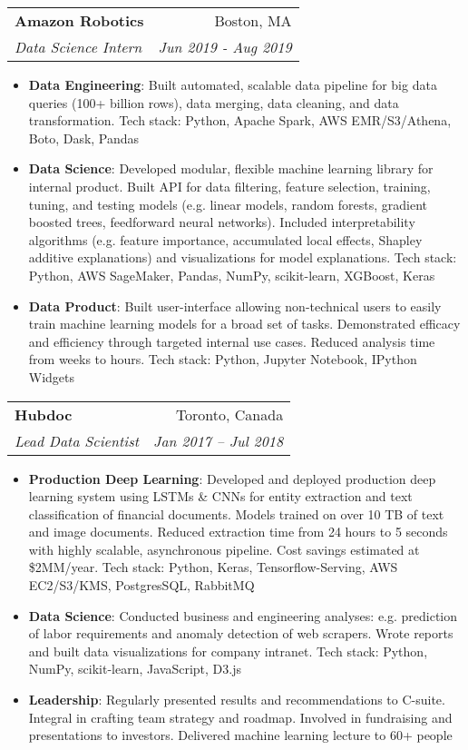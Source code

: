 \documentclass[letterpaper,11pt]{article}
\makeatletter
\newcommand{\resumeItem}[2]{
  \item\small{
    \textbf{#1}{: #2 \vspace{-2pt}}
  }
}
\newcommand{\resumeSubheading}[4]{
  \vspace{-1pt}\item
    \begin{tabular*}{0.97\textwidth}[t]{l@{\extracolsep{\fill}}r}
      \textbf{#1} & #2 \\
      \textit{\small#3} & \textit{\small #4} \\
    \end{tabular*}\vspace{-5pt}
}
\newcommand{\resumeItemListStart}{\begin{itemize}}
\newcommand{\resumeItemListEnd}{\end{itemize}\vspace{-5pt}}
\makeatother
\begin{document}
  \resumeSubheading
    {Amazon Robotics}{Boston, MA}
    {Data Science Intern}{Jun 2019 - Aug 2019}
    \resumeItemListStart
      \resumeItem{Data Engineering}
        {Built automated, scalable data pipeline for big data queries (100+ billion rows), data merging, data cleaning,
        and data transformation. Tech stack: Python, Apache Spark, AWS EMR/S3/Athena, Boto, Dask, Pandas}
      \resumeItem{Data Science}
        {Developed modular, flexible machine learning library for internal product. Built API for data filtering,
        feature selection, training, tuning, and testing models (e.g. linear models, random forests, gradient boosted trees,
        feedforward neural networks). Included interpretability algorithms (e.g. feature importance, accumulated local effects,
        Shapley additive explanations) and visualizations for model explanations. Tech stack: Python, AWS SageMaker, Pandas,
        NumPy, scikit-learn, XGBoost, Keras}
      \resumeItem{Data Product}
        {Built user-interface allowing non-technical users to easily train machine learning models for a broad set of tasks.
        Demonstrated efficacy and efficiency through targeted internal use cases. Reduced analysis time from weeks to hours.
        Tech stack: Python, Jupyter Notebook, IPython Widgets}
    \resumeItemListEnd

    \resumeSubheading
      {Hubdoc}{Toronto, Canada}
      {Lead Data Scientist}{Jan 2017 -- Jul 2018}
      \resumeItemListStart
        \resumeItem{Production Deep Learning}
          {Developed and deployed production deep learning system using LSTMs \& CNNs for entity extraction and
          text classification of financial documents. Models trained on over 10 TB of text and image documents.
          Reduced extraction time from 24 hours to 5 seconds with highly scalable, asynchronous pipeline. Cost savings
          estimated at \$2MM/year. Tech stack: Python, Keras, Tensorflow-Serving, AWS EC2/S3/KMS, PostgresSQL, RabbitMQ}
        \resumeItem{Data Science}
          {Conducted business and engineering analyses: e.g. prediction of labor requirements and anomaly detection of web
          scrapers. Wrote reports and built data visualizations for company intranet. Tech stack: Python, NumPy, scikit-learn,
          JavaScript, D3.js}
        \resumeItem{Leadership}
          {Regularly presented results and recommendations to C-suite. Integral in crafting team strategy and
          roadmap. Involved in fundraising and presentations to investors. Delivered machine learning lecture to 60+ people}
      \resumeItemListEnd
\end{document}
